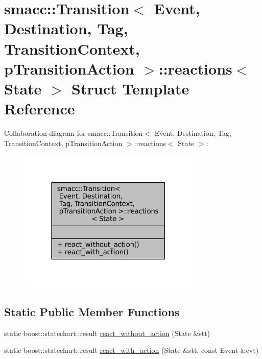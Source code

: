 \hypertarget{structsmacc_1_1Transition_1_1reactions}{}\section{smacc\+:\+:Transition$<$ Event, Destination, Tag, Transition\+Context, p\+Transition\+Action $>$\+:\+:reactions$<$ State $>$ Struct Template Reference}
\label{structsmacc_1_1Transition_1_1reactions}


Collaboration diagram for smacc\+:\+:Transition$<$ Event, Destination, Tag, Transition\+Context, p\+Transition\+Action $>$\+:\+:reactions$<$ State $>$\+:
\nopagebreak
\begin{figure}[H]
\begin{center}
\leavevmode
\includegraphics[width=246pt]{structsmacc_1_1Transition_1_1reactions__coll__graph}
\end{center}
\end{figure}
\subsection*{Static Public Member Functions}
\begin{DoxyCompactItemize}
\item 
static boost\+::statechart\+::result \hyperlink{structsmacc_1_1Transition_1_1reactions_a96a69cf5b0cbd1e8fc49ca57efb37581}{react\+\_\+without\+\_\+action} (State \&stt)
\item 
static boost\+::statechart\+::result \hyperlink{structsmacc_1_1Transition_1_1reactions_a843ddc3d10e2aec66a702745852455c3}{react\+\_\+with\+\_\+action} (State \&stt, const Event \&evt)
\end{DoxyCompactItemize}


